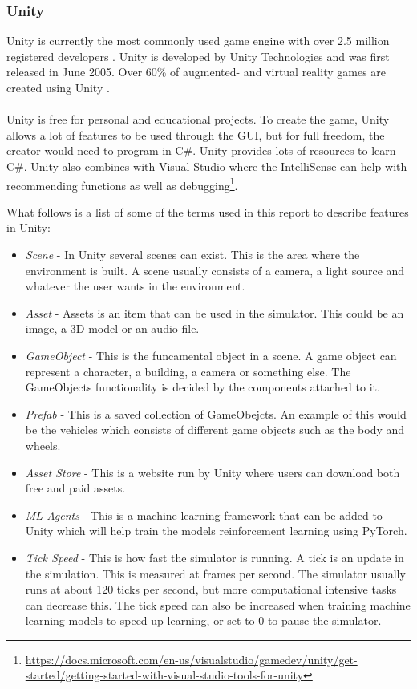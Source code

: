 \subsubsection{Unity}
Unity is currently the most commonly used game engine with over 2.5 million registered developers \cite{Unity_arnia_software}. Unity is developed by Unity Technologies and was first released in June 2005.  Over 60\% of augmented- and virtual reality games are created using Unity \cite{GameEngine_UnityGame_book}. 
\\~\\
Unity is free for personal and educational projects. To create the game, Unity allows a lot of features to be used through the GUI, but for full freedom, the creator would need to program in C\#. Unity provides lots of resources to learn C\#. Unity also combines with Visual Studio where the IntelliSense can help with recommending functions as well as debugging\footnote{\url{https://docs.microsoft.com/en-us/visualstudio/gamedev/unity/get-started/getting-started-with-visual-studio-tools-for-unity}}.

What follows is a list of some of the terms used in this report to describe features in Unity\cite{unityGlossary}:
\begin{itemize}
\item \emph{Scene} - In Unity several scenes can exist. This is the area where the environment is built. A scene usually consists of a camera, a light source and whatever the user wants in the environment. 
\item \emph{Asset} - Assets is an item that can be used in the simulator. This could be an image, a 3D model or an audio file. 
\item \emph{GameObject} - This is the funcamental object in a scene. A game object can represent a character, a building, a camera or something else. The GameObjects functionality is decided by the components attached to it. 
    \item \emph{Prefab} - This is a saved collection of GameObejcts. An example of this would be the vehicles which consists of different game objects such as the body and wheels. 
 \item \emph{Asset Store} - This is a website run by Unity where users can download both free and paid assets. 
 \item \emph{ML-Agents} - This is a machine learning framework that can be added to Unity which will help train the models reinforcement learning using PyTorch. 
 \item \emph{Tick Speed} - This is how fast the simulator is running. A tick is an update in the simulation. This is measured at frames per second. The simulator usually runs at about 120 ticks per second, but more computational intensive tasks can decrease this. The tick speed can also be increased when training machine learning models to speed up learning, or set to 0 to pause the simulator. 
\end{itemize}

